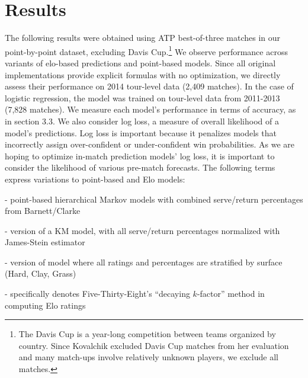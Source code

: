 \documentclass[chapterprefix=false]{report}
\begin{document}
\section{Results}
The following results were obtained using ATP best-of-three matches in our point-by-point dataset, excluding Davis Cup.\footnote{The Davis Cup is a year-long competition between teams organized by country. Since Kovalchik excluded Davis Cup matches from her evaluation \citep{Kovalchik2016} and many match-ups involve relatively unknown players, we exclude all matches.} We observe performance across variants of elo-based predictions and point-based models. Since all original implementations provide explicit formulas with no optimization, we directly assess their performance on 2014 tour-level data (2,409 matches). In the case of logistic regression, the model was trained on tour-level data from 2011-2013 (7,828 matches). We measure each model's performance in terms of accuracy, as in section 3.3. We also consider log loss, a measure of overall likelihood of a model's predictions. Log loss is important because it penalizes models that incorrectly assign over-confident or under-confident win probabilities. As we are hoping to optimize in-match prediction models' log loss, it is important to consider the likelihood of various pre-match forecasts. The following terms express variations to point-based and Elo models:

\begin{description}[leftmargin=2.5cm, labelindent=2.5cm]
\item[KM] - point-based hierarchical Markov models with combined serve/return percentages from Barnett/Clarke

\item[James-Stein] - version of a KM model, with all serve/return percentages normalized with James-Stein estimator

\item[surface] - version of model where all ratings and percentages are stratified by surface (Hard, Clay, Grass)

\item[538] - specifically denotes Five-Thirty-Eight's ``decaying $k$-factor'' method in computing Elo ratings
\end{description}
\end{document}
